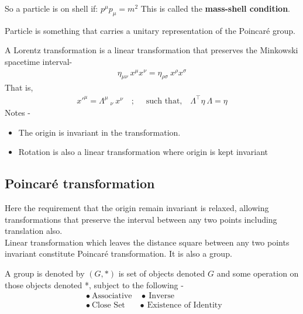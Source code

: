 \documentclass[14pt]{article} %
\begin{document}
So a particle is on shell if: $p^\mu p_\mu = m^2$
This is called the \textbf{mass-shell condition}.

\begin{tcolorbox}[ title=\textbf{Question: What is a particle?}]
Particle is something that carries a unitary representation of the Poincaré group.
\end{tcolorbox}
\begin{tcolorbox}[ title=\textbf{Question: What is Lorentz transformation?}]
A Lorentz transformation is a linear transformation that preserves the Minkowski spacetime interval-
\begin{align*}
\eta_{\mu \nu} ~x^\mu x^\nu = \eta_{\rho \sigma} ~x^\rho x^\sigma 
\end{align*}
That is,
\begin{align*}
x'^{\mu} = \Lambda^{\mu}~_{\nu}~x^\nu \quad;\quad \text{ such that,}\quad \Lambda^\top \eta~ \Lambda=\eta
\end{align*}
Notes -
\begin{itemize}
    \item The origin is invariant in the transformation. 
    \item Rotation is also a linear transformation where origin is kept invariant
\end{itemize}
\end{tcolorbox}
\subsection{Poincaré transformation}
Here the requirement that the origin remain invariant is relaxed, allowing transformations that preserve the interval between any two points including translation also. \\

Linear transformation which leaves the distance square between any two points invariant constitute Poincaré transformation. It is also a group.
\begin{tcolorbox}[ title=\textbf{Question: What are groups? \hfill (set + binary operation)}]
A group is denoted by $(G,*)$ is set of objects denoted $G$ and some operation on those objects denoted *, subject to the following -
\begin{align*}
&\bullet~\text{Associative} \quad \bullet~\text{Inverse} \\
&\bullet~\text{Close Set} \quad ~~~\bullet~\text{Existence of Identity }
\end{align*}
\end{tcolorbox}
\end{document}
